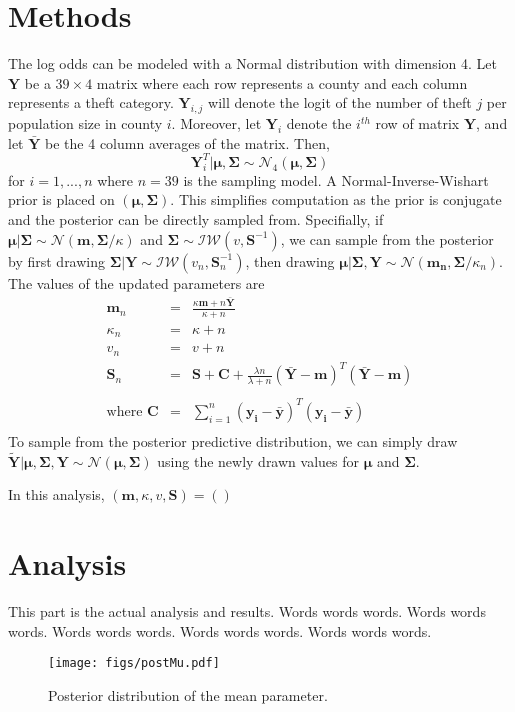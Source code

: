 \documentclass{../../tex_template/asaproc}
\newcommand{\Y}{ \bm Y }
\newcommand{\ds}{ \displaystyle }
\begin{document}
\section{Methods}
The log odds can be modeled with a Normal distribution with dimension 4.  Let
$\bm Y$ be a $39\times 4$ matrix where each row represents a county and each
column represents a theft category. $\bm Y_{i,j}$ will denote the logit of the
number of theft $j$ per population size in county $i$. Moreover, let $\bm Y_i$
denote the $i^{th}$ row of matrix $\bm Y$, and let $\bar{\bm Y}$ be the 4
column averages of the matrix.  Then,
\[
  \Y_i^T | \bm{\mu,\Sigma} \sim \mathcal{N}_4(\bm{\mu,\Sigma})
\]
for $i=1,...,n$ where $n=39$ is the sampling model. A Normal-Inverse-Wishart prior is
placed on $(\bm{\mu,\Sigma})$. This simplifies computation as the prior is
conjugate and the posterior can be directly sampled from. Specifially, if
$\bm\mu | \bm\Sigma \sim \mathcal{N}(\bm{m,\Sigma}/\kappa)$ and $\bm \Sigma
\sim \mathcal{IW}(v,\bm S^{-1})$, we can sample from the posterior by
first drawing $\bm \Sigma | \bm Y \sim \mathcal{IW}(v_n,\bm S_n^{-1})$, then 
drawing $\bm{\mu | \Sigma, Y} \sim \mathcal{N}(\bm{m_n,\Sigma}/\kappa_n)$.
The values of the updated parameters are
\[
\begin{array}{rcl}
  \bm m_n &=& \ds\frac{\kappa\bm m + n\bar{\bm Y}}{\kappa+n} \\
  \kappa_n &=& \kappa + n \\
  v_n &=& v + n \\
  \bm S_n &=& \bm{S + C} + \ds\frac{\lambda n}{\lambda+n} 
  (\boldsymbol{\bm{\bar{Y}-m}})^T(\boldsymbol{\bm{\bar{Y}-m}}) \\
  \\
  \text{where } \boldsymbol{C} &=& \sum_{i=1}^{n} (\boldsymbol{y_i-\bar{y}})^T(\boldsymbol{y_i-\bar{y}}) \\
\end{array}
\]
To sample from the posterior predictive distribution, we can simply draw
$\tilde{\bm Y} | \bm{\mu,\Sigma,Y} \sim \mathcal{N}(\bm{\mu,\Sigma})$ using the newly drawn
values for $\bm\mu$ and $\bm\Sigma$.

In this analysis, $(\bm m, \kappa, v, \bm S) = ()$



\section{Analysis}
This part is the actual analysis and results.
Words words words.  Words words words.  Words words words.  Words words words.  Words words words.
\begin{figure}
  \centering
  \texttt{[image: figs/postMu.pdf]}
  \caption{Posterior distribution of the mean parameter.}
  \label{fig:postMu}
\end{figure}
\end{document}
